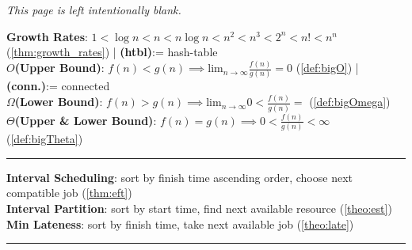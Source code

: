 \vfill

\begin{center}
\textit{This page is left intentionally blank.}
\end{center}
\vfill
\newpage

\noindent
\textbf{Growth Rates}: $1 < \log n < n < n \log n < n^2 < n^3 < 2^n < n! < n^n$ (\ref{thm:growth_rates}) | \textbf{(htbl)}:= hash-table\\
\textbf{$O$(Upper Bound)}: $f(n) < g(n)\implies $lim$_{n\to\infty}\frac{f(n)}{g(n)}=0$ (\ref{def:bigO}) \hspace{5.47em}| \textbf{(conn.)}:= connected\\
\textbf{$\Omega$(Lower Bound)}: $f(n) > g(n)\implies $lim$_{n\to\infty}0<\frac{f(n)}{g(n)}=$ (\ref{def:bigOmega})\\
\textbf{$\Theta$(Upper \& Lower Bound)}: $f(n) = g(n)\implies 0<\frac{f(n)}{g(n)}<\infty$ (\ref{def:bigTheta})\\
\noindent\rule{\textwidth}{0.4pt}
\textbf{Interval Scheduling}: sort by finish time ascending order, choose next compatible job (\ref{thm:eft})\\
\textbf{Interval Partition}: sort by start time, find next available resource (\ref{theo:est})\\
\textbf{Min Lateness}: sort by finish time, take next available job (\ref{theo:late})\\
\noindent\rule{\textwidth}{0.4pt}

\vspace{.5em}
\noindent

